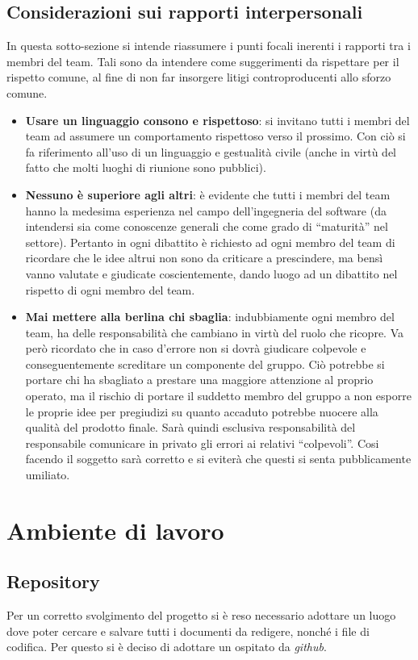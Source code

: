 \subsection{Considerazioni sui rapporti interpersonali}

In questa sotto-sezione si intende riassumere i punti focali inerenti i rapporti tra i membri del team. Tali sono da intendere come suggerimenti da rispettare per il rispetto comune, al fine di non far insorgere litigi controproducenti allo sforzo comune.

\begin{itemize}
	\item \textbf{Usare un linguaggio consono e rispettoso}: si invitano tutti i membri del team ad assumere un comportamento rispettoso verso il prossimo. Con ciò si fa riferimento all'uso di un linguaggio e gestualità civile (anche in virtù del fatto che molti luoghi di riunione sono pubblici).
	\item \textbf{Nessuno è superiore agli altri}: è evidente che tutti i membri del team hanno la medesima esperienza nel campo dell'ingegneria del software (da intendersi sia come conoscenze generali che come grado di ``maturità'' nel settore). Pertanto in ogni dibattito  è richiesto ad ogni membro del team di ricordare che le idee altrui non sono da criticare a prescindere, ma bensì vanno valutate e giudicate coscientemente, dando luogo ad un dibattito nel rispetto di ogni membro del team.
	\item \textbf{Mai mettere alla berlina chi sbaglia}: indubbiamente ogni membro del team, ha delle responsabilità che cambiano in virtù del ruolo che ricopre. Va però ricordato che in caso d'errore non si dovrà giudicare colpevole e conseguentemente screditare un componente del gruppo. Ciò potrebbe si portare chi ha sbagliato a prestare una maggiore attenzione al proprio operato, ma il rischio di  portare il suddetto membro del gruppo a non esporre le proprie idee per pregiudizi su quanto accaduto potrebbe nuocere alla qualità del prodotto finale. Sarà quindi esclusiva responsabilità del responsabile comunicare in privato gli errori ai relativi ``colpevoli''. Cosi facendo il soggetto sarà corretto e si eviterà che questi si senta pubblicamente umiliato.
\end{itemize}

\newpage
\section{Ambiente di lavoro}
\subsection{Repository}
\label{sec:repository}
Per un corretto svolgimento del progetto si è reso necessario adottare un luogo dove poter cercare e salvare tutti i documenti da redigere, nonché i file di codifica. Per questo si è deciso di adottare un \underline{} ospitato da \textit{github}.

